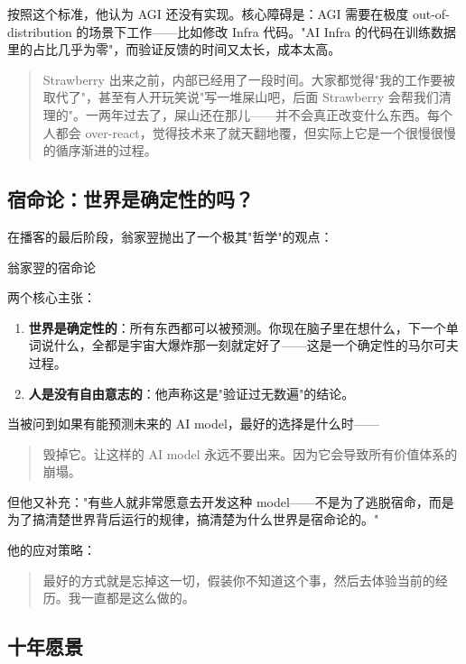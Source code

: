 \documentclass[a4paper]{article}
\begin{document}
按照这个标准，他认为 AGI 还没有实现。核心障碍是：AGI 需要在极度 out-of-distribution 的场景下工作——比如修改 Infra 代码。"AI Infra 的代码在训练数据里的占比几乎为零"，而验证反馈的时间又太长，成本太高。

\begin{quote}
Strawberry 出来之前，内部已经用了一段时间。大家都觉得"我的工作要被取代了"，甚至有人开玩笑说"写一堆屎山吧，后面 Strawberry 会帮我们清理的"。一两年过去了，屎山还在那儿——并不会真正改变什么东西。每个人都会 over-react，觉得技术来了就天翻地覆，但实际上它是一个很慢很慢的循序渐进的过程。
\end{quote}

\subsection{宿命论：世界是确定性的吗？}

在播客的最后阶段，翁家翌抛出了一个极其"哲学"的观点：

\begin{importantbox}{翁家翌的宿命论}

两个核心主张：
\begin{enumerate}
\item \textbf{世界是确定性的}：所有东西都可以被预测。你现在脑子里在想什么，下一个单词说什么，全都是宇宙大爆炸那一刻就定好了——这是一个确定性的马尔可夫过程。
\item \textbf{人是没有自由意志的}：他声称这是"验证过无数遍"的结论。
\end{enumerate}
\end{importantbox}


当被问到如果有能预测未来的 AI model，最好的选择是什么时——

\begin{quote}
毁掉它。让这样的 AI model 永远不要出来。因为它会导致所有价值体系的崩塌。
\end{quote}

但他又补充："有些人就非常愿意去开发这种 model——不是为了逃脱宿命，而是为了搞清楚世界背后运行的规律，搞清楚为什么世界是宿命论的。"

他的应对策略：

\begin{quote}
最好的方式就是忘掉这一切，假装你不知道这个事，然后去体验当前的经历。我一直都是这么做的。
\end{quote}

\subsection{十年愿景}
\end{document}
